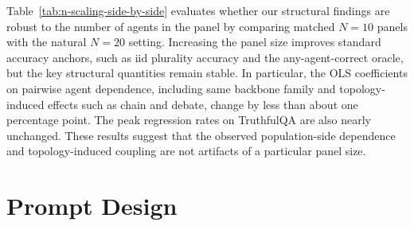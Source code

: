 Table~\ref{tab:n-scaling-side-by-side} evaluates whether our structural findings are robust to the number of agents in the panel by comparing matched \(N=10\) panels with the natural \(N=20\) setting. 
Increasing the panel size improves standard accuracy anchors, such as iid plurality accuracy and the any-agent-correct oracle, but the key structural quantities remain stable. 
In particular, the OLS coefficients on pairwise agent dependence, including same backbone family and topology-induced effects such as chain and debate, change by less than about one percentage point. 
The peak regression rates on TruthfulQA are also nearly unchanged. 
These results suggest that the observed population-side dependence and topology-induced coupling are not artifacts of a particular panel size.





\section{Prompt Design}
\label{app:prompt}

